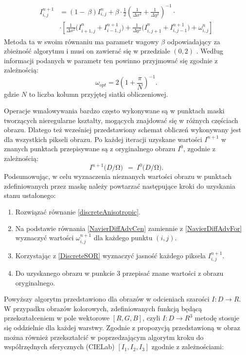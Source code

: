 \documentclass[12pt, twoside, openany]{report}
\theoremstyle{definition}
\begin{document}
\begin{align}
\begin{aligned}
I^{n+1}_{i,j}
&= \left(1-\ \beta \right)I^n_{i,j}+\beta \cdot \frac{1}{2}{\left(\frac{1}{\Delta x^2}+\frac{1}{\Delta y^2}\right)}^{-1} \cdot \\[1ex]
&\cdot \left[\frac{1}{\Delta x^2}{(I}^n_{i+1,j}+I^{n+1}_{i-1,j})+\frac{1}{\Delta y^2}{(I}^n_{i,j+1}+I^{n+1}_{i,j-1})+{\omega }^n_{i,j}\right]
\end{aligned}
\label{DiscreteSOR}
\end{align}
Metoda ta w swoim równaniu ma parametr wagowy $\beta$ odpowiadający za zbieżność algorytmu i musi on zawierać się w przedziale $(0,2)$ \cite{neumann1981kahan}. Według informacji podanych w  \cite{blacksuccessive} parametr ten powinno przyjmować się zgodnie z zależnością:
\begin{equation}
{\omega }_{opt}=2{\left(1+\frac{\pi }{N}\right)}^{-1}
\label{BetaChoose}
.
\end{equation}
gdzie $N$ to liczba kolumn przyjętej siatki obliczeniowej. 
\par
Operacje wmalowywania bardzo często wykonywane są w punktach maski tworzących nieregularne kształty, mogących znajdować się w różnych częściach obrazu. Dlatego też wcześniej przedstawiony schemat obliczeń wykonywany jest dla wszystkich pikseli obrazu. Po każdej iteracji uzyskane wartości $I^{n+1}$ w znanych punktach przepisywane są z oryginalnego obrazu $I^{0}$, zgodnie z zależnością:
\begin{equation}
I^{n+1}(D/\mathrm{\Omega }\mathrm{)\ }\ ={\ I}^0(D/\mathrm{\Omega }\mathrm{)}.
\label{retrieveMask}
\end{equation}
Podsumowując, w celu wyznaczenia nieznanych wartości obrazu w punktach zdefiniowanych przez maskę należy powtarzać następujące kroki do uzyskania stanu ustalonego:
\begin{enumerate}
\item
Rozwiązać równanie \eqref{discreteAnisotropic}.
\item
Na podstawie równania \eqref{NavierDiffAdvCen} zamiennie z \eqref{NavierDiffAdvFor} wyznaczyć wartości $\omega_{i,j}^{n+1}$ dla każdego punktu $(i,j)$.
\item
Korzystając z \eqref{DiscreteSOR} wyznaczyć jasność każdego piksela $I_{i,j}^{n+1}$.
\item
Do uzyskanego obrazu w punkcie 3 przepisać znane wartości z obrazu oryginalnego.
\end{enumerate}
Powyższy algorytm przedstawiono dla obrazów w odcieniach szarości $I:D\to R$. W przypadku obrazów kolorowych, zdefiniowanych funkcją będącą przekształceniem w pole wektorowe $[R,G,B]$, czyli $I:D\to R^3$ metodę stosuje się oddzielnie dla każdej warstwy. Zgodnie z propozycją przedstawioną w \cite{fishelov2006image} obraz można również przekształcić w poprzedzającym algorytm kroku do współrzędnych sferycznych (CIELab) $\left[I_{1},I_{2},I_{3} \right]$ zgodnie z zależnościami:
\end{document}
